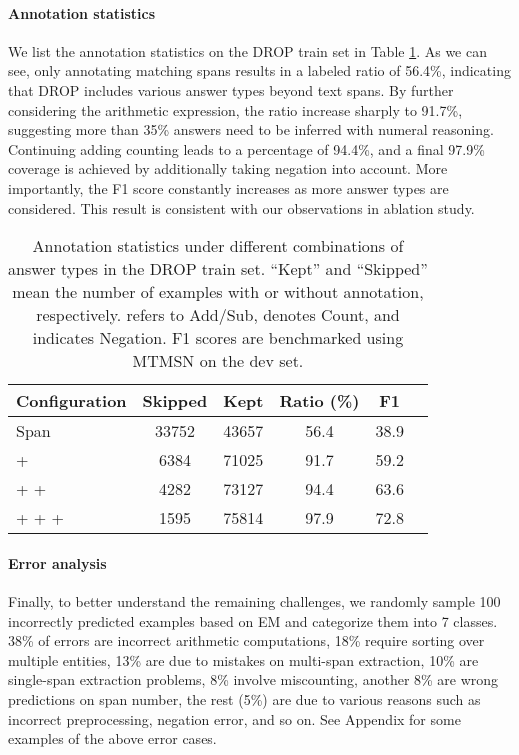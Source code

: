 \documentclass[11pt,a4paper]{article}
\newcommand\mtmsnbase{MTMSN\xspace}
\begin{document}
\paragraph{Annotation statistics}
We list the annotation statistics on the DROP train set in Table \ref{table:statis}. 
As we can see, only annotating matching spans results in a labeled ratio of 56.4\%, indicating that DROP includes various answer types beyond text spans.
By further considering the arithmetic expression, the ratio increase sharply to 91.7\%, suggesting more than 35\% answers need to be inferred with numeral reasoning.
Continuing adding counting leads to a percentage of 94.4\%, and a final 97.9\% coverage is achieved by additionally taking negation into account.
More importantly, the F1 score constantly increases as more answer types are considered. This result is consistent with our observations in ablation study.

\begin{table}
	\begin{center}
		\small
		\begin{tabular}{l|ccccc}
			\toprule
			Configuration & Skipped & Kept & Ratio (\%) & F1  \\ 
			\midrule
			Span                & 33752 & 43657 & 56.4 & 38.9 \\
			+             & 6384 & 71025 & 91.7 & 59.2 \\
			+  +               & 4282 & 73127 & 94.4 & 63.6 \\
			+  +  +            & 1595 & 75814 & 97.9 & 72.8 \\
			\bottomrule
		\end{tabular}
		\caption{\label{table:statis} Annotation statistics under different combinations of answer types in the DROP train set. ``Kept'' and ``Skipped'' mean the number of examples with or without annotation, respectively.  refers to Add/Sub,  denotes Count, and  indicates Negation. F1 scores are benchmarked using \mtmsnbase on the dev set.}
	\end{center}
\end{table}

\paragraph{Error analysis}
Finally, to better understand the remaining challenges, we randomly sample 100 incorrectly predicted examples based on EM and categorize them into 7 classes.
38\% of errors are incorrect arithmetic computations, 18\% require sorting over multiple entities, 13\% are due to mistakes on multi-span extraction, 10\% are single-span extraction problems, 8\% involve miscounting, another 8\% are wrong predictions on span number, the rest (5\%) are due to various reasons such as incorrect preprocessing, negation error, and so on.
See Appendix for some examples of the above error cases.
\end{document}
